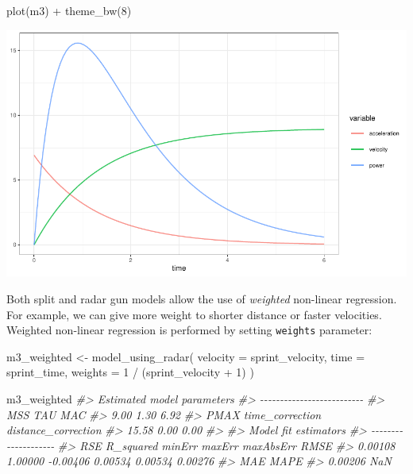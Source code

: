 \documentclass[fleqn,10pt,lineno]{wlpeerj} %
\newenvironment{Shaded}{\begin{snugshade}}{\end{snugshade}}
\newcommand{\AttributeTok}[1]{\textcolor[rgb]{0.77,0.63,0.00}{#1}}
\newcommand{\CommentTok}[1]{\textcolor[rgb]{0.56,0.35,0.01}{\textit{#1}}}
\newcommand{\DecValTok}[1]{\textcolor[rgb]{0.00,0.00,0.81}{#1}}
\newcommand{\FunctionTok}[1]{\textcolor[rgb]{0.00,0.00,0.00}{#1}}
\newcommand{\NormalTok}[1]{#1}
\newcommand{\OtherTok}[1]{\textcolor[rgb]{0.56,0.35,0.01}{#1}}
\newcommand{\SpecialCharTok}[1]{\textcolor[rgb]{0.00,0.00,0.00}{#1}}
\begin{document}
\begin{Shaded}
\begin{Highlighting}[]
\FunctionTok{plot}\NormalTok{(m3) }\SpecialCharTok{+} \FunctionTok{theme\_bw}\NormalTok{(}\DecValTok{8}\NormalTok{)}
\end{Highlighting}
\end{Shaded}

\begin{center}\includegraphics[width=1\linewidth]{paper_files/figure-latex/unnamed-chunk-17-1} \end{center}

Both split and radar gun models allow the use of \emph{weighted} non-linear regression. For example, we can give more weight to shorter distance or faster velocities. Weighted non-linear regression is performed by setting \texttt{weights} parameter:

\begin{Shaded}
\begin{Highlighting}[]
\NormalTok{m3\_weighted }\OtherTok{\textless{}{-}} \FunctionTok{model\_using\_radar}\NormalTok{(}
  \AttributeTok{velocity =}\NormalTok{ sprint\_velocity,}
  \AttributeTok{time =}\NormalTok{ sprint\_time,}
  \AttributeTok{weights =} \DecValTok{1} \SpecialCharTok{/}\NormalTok{ (sprint\_velocity }\SpecialCharTok{+} \DecValTok{1}\NormalTok{)}
\NormalTok{)}

\NormalTok{m3\_weighted}
\CommentTok{\#\textgreater{} Estimated model parameters}
\CommentTok{\#\textgreater{} {-}{-}{-}{-}{-}{-}{-}{-}{-}{-}{-}{-}{-}{-}{-}{-}{-}{-}{-}{-}{-}{-}{-}{-}{-}{-}}
\CommentTok{\#\textgreater{}                 MSS                 TAU                 MAC }
\CommentTok{\#\textgreater{}                9.00                1.30                6.92 }
\CommentTok{\#\textgreater{}                PMAX     time\_correction distance\_correction }
\CommentTok{\#\textgreater{}               15.58                0.00                0.00 }
\CommentTok{\#\textgreater{} }
\CommentTok{\#\textgreater{} Model fit estimators}
\CommentTok{\#\textgreater{} {-}{-}{-}{-}{-}{-}{-}{-}{-}{-}{-}{-}{-}{-}{-}{-}{-}{-}{-}{-}}
\CommentTok{\#\textgreater{}       RSE R\_squared    minErr    maxErr maxAbsErr      RMSE }
\CommentTok{\#\textgreater{}   0.00108   1.00000  {-}0.00406   0.00534   0.00534   0.00276 }
\CommentTok{\#\textgreater{}       MAE      MAPE }
\CommentTok{\#\textgreater{}   0.00206       NaN}
\end{Highlighting}
\end{Shaded}
\end{document}
